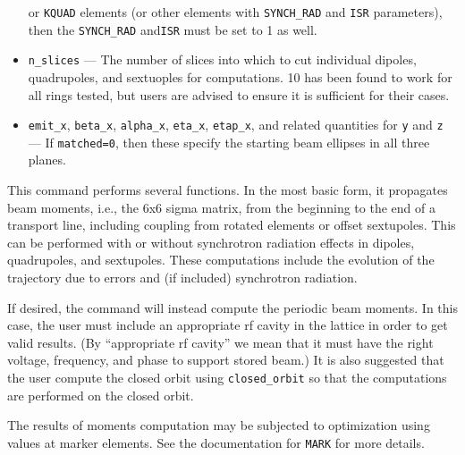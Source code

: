 \documentclass[11pt]{article}
\begin{document}
\begin{itemize}
  or \verb|KQUAD| elements (or other elements with \verb|SYNCH_RAD| and \verb|ISR| parameters), then the \verb|SYNCH_RAD| and\verb|ISR| must be set to 1 as well.
\item \verb|n_slices| --- The number of slices into which to cut individual dipoles, quadrupoles, and sextuoples for computations.
  10 has been found to work for all rings tested, but users are advised to ensure it is sufficient for their cases.
\item \verb|emit_x|, \verb|beta_x|, \verb|alpha_x|, \verb|eta_x|, \verb|etap_x|, and related quantities for \verb|y| and \verb|z| ---
  If \verb|matched=0|, then these specify the starting beam ellipses in all three planes.
\end{itemize}

This command performs several functions.  In the most basic form, it
propagates beam moments, i.e., the 6x6 sigma matrix, from the
beginning to the end of a transport line, including coupling from
rotated elements or offset sextupoles. This can be performed with or
without synchrotron radiation effects in dipoles, quadrupoles, and sextupoles.
These computations
include the evolution of the trajectory due to errors and (if included)
synchrotron radiation.

If desired, the command will instead compute the periodic beam
moments.  In this case, the user must include an appropriate rf cavity
in the lattice in order to get valid results.  (By ``appropriate rf
cavity'' we mean that it must have the right voltage, frequency, and
phase to support stored beam.)  It is also suggested that the user
compute the closed orbit using \verb|closed_orbit| so that the
computations are performed on the closed orbit.

The results of moments computation may be subjected to optimization
using values at marker elements.  See the documentation for
\verb|MARK| for more details.
\end{document}
